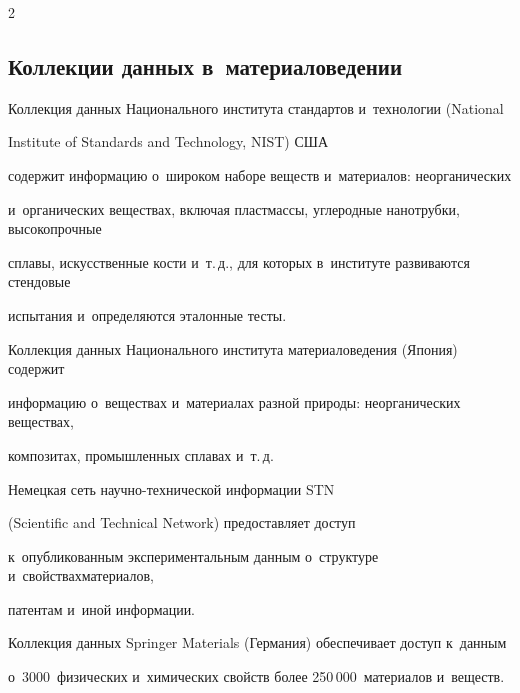 \begin{multicols}{2}
  


\subsection{Коллекции данных в~материаловедении}





\vspace*{-1pt}





  Коллекция данных Национального института стандартов и~технологии (National


  Institute of Standards and Technology, NIST) США 


содержит информацию о~широком наборе веществ и~материалов: неорганических 


и~органических веществах, включая пластмассы, углеродные нанотрубки, высокопрочные 


сплавы, искусственные кости и~т.\,д., для которых в~институте развиваются стендовые 


испытания и~определяются эталонные тесты.


  


  Коллекция данных Национального института материаловедения (Япония) содержит 


информацию о~веществах и~материалах разной природы: неорганических веществах, 


композитах, промышленных сплавах и~т.\,д.


  


  Немецкая сеть на\-уч\-но-тех\-ни\-че\-ской инфор\-мации STN 


  (Scientific and Technical Network) предо\-став\-ля\-ет доступ 


к~опубликованным экспери\-ментальным данным о~структуре и~свойствах\linebreak материалов, 


патентам и~иной информации.


  


  Коллекция данных Springer Materials (Германия) обеспечивает доступ к~данным 


о~3000~физических и~химических свойств более 250\,000~материалов и~веществ.





\vspace*{-4pt}



\end{multicols}
